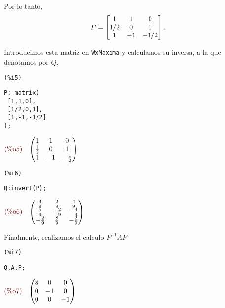 \begin{solucion}
Por lo tanto,
$$
P=\begin{bmatrix}1&1&0\\ 1/2 & 0 & 1 \\ 1 & -1 &-1/2 \end{bmatrix}.
$$

Introducimos esta matriz en \texttt{WxMaxima} y calculamos su inversa, a la que denotamos por $Q.$


\noindent
%
\begin{minipage}{8ex}{\color{red}\bf
\begin{verbatim}
(%i5)
\end{verbatim}}
\end{minipage}
\begin{minipage}{\textwidth}{\color{blue}
\begin{verbatim}
P: matrix(
 [1,1,0],
 [1/2,0,1],
 [1,-1,-1/2]
);
\end{verbatim}}
\end{minipage}
\begin{math}\displaystyle
\parbox{8ex}{\color{labelcolor}(\%o5) }
\begin{pmatrix}1 & 1 & 0\cr \frac{1}{2} & 0 & 1\cr 1 & -1 & -\frac{1}{2}\end{pmatrix}
\end{math}
%


\noindent
%
\begin{minipage}{8ex}{\color{red}\bf
\begin{verbatim}
(%i6)
\end{verbatim}}
\end{minipage}
\begin{minipage}{\textwidth}{\color{blue}
\begin{verbatim}
Q:invert(P);
\end{verbatim}}
\end{minipage}
\begin{math}\displaystyle
\parbox{8ex}{\color{labelcolor}(\%o6) }
\begin{pmatrix}\frac{4}{9} & \frac{2}{9} & \frac{4}{9}\cr \frac{5}{9} & -\frac{2}{9} & -\frac{4}{9}\cr -\frac{2}{9} &
\frac{8}{9} & -\frac{2}{9}\end{pmatrix}
\end{math}
%

Finalmente, realizamos el calculo $P^{-1}AP$

\noindent
%
\begin{minipage}{8ex}{\color{red}\bf
\begin{verbatim}
(%i7)
\end{verbatim}}
\end{minipage}
\begin{minipage}{\textwidth}{\color{blue}
\begin{verbatim}
Q.A.P;
\end{verbatim}}
\end{minipage}
\begin{math}\displaystyle
\parbox{8ex}{\color{labelcolor}(\%o7) }
\begin{pmatrix}8 & 0 & 0\cr 0 & -1 & 0\cr 0 & 0 & -1\end{pmatrix}
\end{math}
%


\end{solucion}
